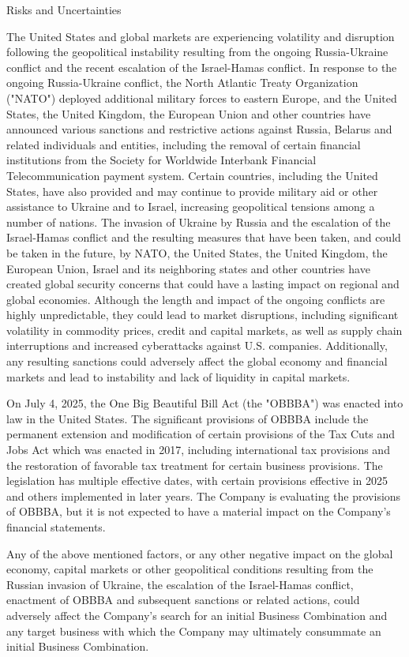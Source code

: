 \documentclass[11pt,a4paper]{article}
\begin{document}
Risks and Uncertainties

The United States and global markets are experiencing volatility and disruption following the geopolitical instability resulting from the ongoing Russia-Ukraine conflict and the recent escalation of the Israel-Hamas conflict. In response to the ongoing Russia-Ukraine conflict, the North Atlantic Treaty Organization ("NATO") deployed additional military forces to eastern Europe, and the United States, the United Kingdom, the European Union and other countries have announced various sanctions and restrictive actions against Russia, Belarus and related individuals and entities, including the removal of certain financial institutions from the Society for Worldwide Interbank Financial Telecommunication payment system. Certain countries, including the United States, have also provided and may continue to provide military aid or other assistance to Ukraine and to Israel, increasing geopolitical tensions among a number of nations. The invasion of Ukraine by Russia and the escalation of the Israel-Hamas conflict and the resulting measures that have been taken, and could be taken in the future, by NATO, the United States, the United Kingdom, the European Union, Israel and its neighboring states and other countries have created global security concerns that could have a lasting impact on regional and global economies. Although the length and impact of the ongoing conflicts are highly unpredictable, they could lead to market disruptions, including significant volatility in commodity prices, credit and capital markets, as well as supply chain interruptions and increased cyberattacks against U.S. companies. Additionally, any resulting sanctions could adversely affect the global economy and financial markets and lead to instability and lack of liquidity in capital markets.

On July 4, 2025, the One Big Beautiful Bill Act (the "OBBBA") was enacted into law in the United States. The significant provisions of OBBBA include the permanent extension and modification of certain provisions of the Tax Cuts and Jobs Act which was enacted in 2017, including international tax provisions and the restoration of favorable tax treatment for certain business provisions. The legislation has multiple effective dates, with certain provisions effective in 2025 and others implemented in later years. The Company is evaluating the provisions of OBBBA, but it is not expected to have a material impact on the Company's financial statements.

Any of the above mentioned factors, or any other negative impact on the global economy, capital markets or other geopolitical conditions resulting from the Russian invasion of Ukraine, the escalation of the Israel-Hamas conflict, enactment of OBBBA and subsequent sanctions or related actions, could adversely affect the Company's search for an initial Business Combination and any target business with which the Company may ultimately consummate an initial Business Combination.
\end{document}
